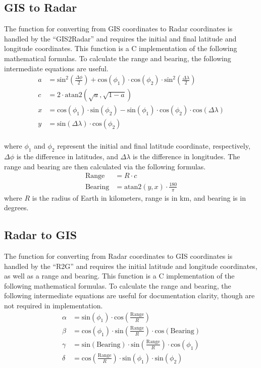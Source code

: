 \documentclass{article}
\begin{document}
\subsection{GIS to Radar}
The function for converting from GIS coordinates to Radar coordinates is handled by the ``GIS2Radar'' and requires the initial and final latitude and longitude coordinates. This function is a C implementation of the following mathematical formulas. To calculate the range and bearing, the following intermediate equations are useful.
\begin{align*}
    a &= \text{sin}^2\left(\frac{\Delta \phi}{2}\right) + 
    \text{cos}(\phi_1) \cdot \text{cos}(\phi_2) \cdot 
    \text{sin}^2\left(\frac{\Delta \lambda}{2}\right) \\
    c &= 2 \cdot \text{atan2}\left(\sqrt{a}, \sqrt{1-a}\right) \\
    x &= \text{cos}(\phi_1) \cdot \text{sin}(\phi_2) - 
    \text{sin}(\phi_1) \cdot \text{cos}(\phi_2) \cdot 
    \text{cos}(\Delta\lambda) \\
    y &= \text{sin}(\Delta\lambda) \cdot \text{cos}(\phi_2) \\
\end{align*}

where $\phi_1$ and $\phi_2$ represent the initial and final latitude coordinate, respectively, $\Delta\phi$ is the difference in latitudes, and $\Delta\lambda$ is the difference in longitudes. The range and bearing are then calculated via the following formulas.
\begin{align*}
    \text{Range} &= R\cdot c \\
    \text{Bearing} &= \text{atan2}(y,x) \cdot \frac{180}{\pi}
\end{align*}
where $R$ is the radius of Earth in kilometers, range is in km, and bearing is in degrees.


\subsection{Radar to GIS}
The function for converting from Radar coordinates to GIS coordinates is handled by the ``R2G'' and requires the initial latitude and longitude coordinates, as well as a range and bearing. This function is a C implementation of the following mathematical formulas. To calculate the range and bearing, the following intermediate equations are useful for documentation clarity, though are not required in implementation.
\begin{align*}
    \alpha &= \text{sin}(\phi_1) 
    \cdot \text{cos}\left(\frac{\text{Range}}{R} \right) \\
    \beta &= \text{cos}(\phi_1) \cdot \text{sin} \left( \frac{\text{Range}}{R} \right) \cdot \text{cos}(
    \text{Bearing}) \\
    \gamma &= \text{sin}(\text{Bearing}) \cdot \text{sin} \left( 
    \frac{\text{Range}}{R} \right) \cdot \text{cos}(\phi_1) \\
    \delta &= \text{cos}\left( 
    \frac{\text{Range}}{R} \right) \cdot \text{sin}(\phi_1) \cdot \text{sin}(\phi_2)
\end{align*}
\end{document}
